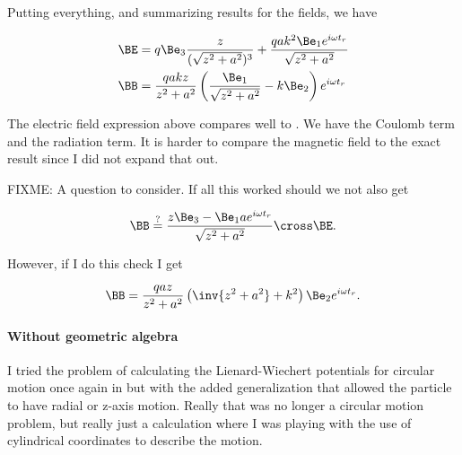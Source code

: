 {Putting everything, and summarizing results for the fields, we have

\begin{equation}\label{eqn:relativisticElectrodynamicsExamReflection:250}
\begin{aligned}
\BE &= 
q \Be_3 \frac{z}{(\sqrt{z^2 + a^2})^3}
+
\frac{q a k^2 \Be_1 e^{i \omega t_r} }{\sqrt{z^2 + a^2}} \\
\BB 
&= \frac{q a k z}{ z^2 + a^2} \left( \frac{\Be_1}{\sqrt{z^2 + a^2}} - k \Be_2 \right) e^{i \omega t_r}
\end{aligned}
\end{equation}

The electric field expression above compares well to .  We have the Coulomb term and the radiation term.  It is harder to compare the magnetic field to the exact result  since I did not expand that out.

FIXME: A question to consider.  If all this worked should we not also get

\begin{equation}\label{eqn:relativisticElectrodynamicsExamReflection:270}
\BB 
\stackrel{?}{=}
\frac{z \Be_3 - \Be_1 a e^{i \omega t_r}}{\sqrt{z^2 + a^2}} \cross \BE.
\end{equation}

However, if I do this check I get

\begin{equation}\label{eqn:relativisticElectrodynamicsExamReflection:290}
\BB 
=
\frac{q a z}{z^2 + a^2} \left( \inv{z^2 + a^2} + k^2 \right) \Be_2 e^{i \omega t_r}.
\end{equation}


\paragraph{Without geometric algebra}

I tried the problem of calculating the Lienard-Wiechert potentials for circular motion once again in \citep{gabook:matrixVectorPotentials} but with the added generalization that allowed the particle to have radial or z-axis motion.  Really that was no longer a circular motion problem, but really just a calculation where I was playing with the use of cylindrical coordinates to describe the motion.

}
